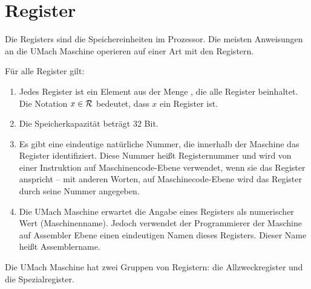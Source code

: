 \section{Register}
\label{sec:Register}

Die \glspl{Register} sind die Speichereinheiten im Prozessor.
Die meisten Anweisungen an die UMach Maschine operieren auf einer Art mit den
Registern.

Für alle Register gilt:
\begin{enumerate}
  \item Jedes Register ist ein Element aus der Menge \Reg, die alle Register
    beinhaltet.\index{\Reg}
    Die Notation $x \in \mathcal{R}$ bedeutet, dass $x$ ein Register ist.
  \item Die Speicherkapazität beträgt 32 Bit.
  \item Es gibt eine eindeutige natürliche Nummer, die innerhalb der
    Maschine das Register identifiziert. Diese Nummer heißt
    \gls{Registernummer}
    und wird von einer Instruktion auf Maschinencode-Ebene verwendet, wenn sie
    das Register anspricht -- mit anderen Worten, auf Maschinecode-Ebene wird 
    das Register durch seine Nummer angegeben.
  \item Die UMach Maschine erwartet die Angabe eines Registers als numerischer
    Wert (Maschinenname). Jedoch verwendet der Programmierer der Maschine auf
    Assembler Ebene einen eindeutigen Namen dieses Registers.
    Dieser Name heißt
    \gls{Assemblername}.
\end{enumerate}

Die UMach Maschine hat zwei Gruppen von Registern: die Allzweckregister und
die Spezialregister.





